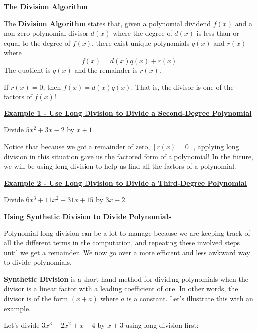 \documentclass[12pt]{book}
\begin{document}
\begin{boxR}
    \textbf{The Division Algorithm}
    \hspace{1mm}
    \hline
    \hspace{2mm}
    
    The \textbf{Division Algorithm} states that, given a polynomial dividend $f(x)$ and a non-zero polynomial divisor $d(x)$ where the degree of $d(x)$  is less than or equal to the degree of $f(x)$, there exist unique polynomials $q(x)$ and  $r(x)$ where 
    $$ f(x) = d(x)q(x) + r(x)$$
    The quotient is $q(x)$ and the remainder is $r(x)$.
    \vspace{1mm}
    
    If $r(x)=0$, then $f(x)=d(x)q(x)$. That is, the divisor is one of the factors of $f(x)$!
\end{boxR}
\bigskip


\underline{\textbf{Example 1 - Use Long Division to Divide a Second-Degree Polynomial}}

Divide $5x^2+3x-2$ by $x+1$.
\vspace{120mm}

Notice that because we got a remainder of zero, $\left[r(x)=0\right]$, applying long division in this situation gave us the factored form of a polynomial! In the future, we will be using long division to help us find all the factors of a polynomial.
\newpage

\underline{\textbf{Example 2 - Use Long Division to Divide a Third-Degree Polynomial}}

Divide $6x^3+11x^2-31x+15$ by $3x-2$.


\newpage
{\large \textbf{Using Synthetic Division to Divide Polynomials}}
\vspace{2mm}

Polynomial long division can be a lot to manage because we are keeping track of all the different terms in the computation, and repeating these involved steps until we get a remainder. We now go over a more efficient and less awkward way to divide polynomials.
\vspace{2mm}

\textbf{Synthetic Division} is a short hand method for dividing polynomials when the divisor is a linear factor with a leading coefficient of one. In other words, the divisor is of the form $(x+a)$ where $a$ is a constant.  Let's illustrate this with an example. 
\vspace{2mm}

Let's divide $3x^3-2x^2+x-4$ by $x+3$ using long division first:
\end{document}
